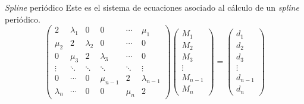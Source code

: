 \begin{frame}{\textit{Spline} periódico}
    Este es el sistema de ecuaciones asociado al cálculo
    de un \textit{spline} periódico.
    \[
    \begin{pmatrix}
        2 & \lambda_1 & 0 & 0 & \cdots & \mu_1\\
        \mu_2 & 2 & \lambda_2 & 0 & \cdots & 0\\
        0 & \mu_3 & 2 & \lambda_3 & \cdots & 0\\
        \vdots & \ddots& \ddots & \ddots & \ddots & \vdots\\
        0 & \cdots & 0 & \mu_{n-1} & 2 & \lambda_{n-1}\\
        \lambda_n & \cdots & 0 & 0 & \mu_{n} & 2 
    \end{pmatrix}
    \begin{pmatrix}
        M_1 \\ M_2 \\ M_3 \\ \vdots \\ M_{n-1} \\ M_{n}
    \end{pmatrix}
    =
    \begin{pmatrix}
        d_1 \\ d_2 \\ d_3 \\ \vdots \\ d_{n-1} \\ d_{n}
    \end{pmatrix}
    \]
\end{frame}
